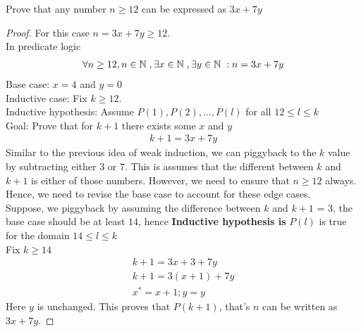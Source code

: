 \documentclass[11pt]{article}
\begin{document}
\begin{theorem}
    Prove that any number $n \geq 12$ can be expressed as $3x + 7y$
\end{theorem}

\begin{proof}
    For this case $n = 3x + 7y \geq 12$. \\
    In predicate logic
    \begin{gather}
        \forall n \geq 12, n \in \mathbb{N}\hspace{1.0mm}, \exists x \in \mathbb{N}\hspace{1.0mm}, \exists y \in \mathbb{N}\hspace{1.0mm}: n = 3x + 7y
    \end{gather}
    Base case: $x = 4$ and $y = 0$ \\
    Inductive case: Fix $k \geq 12$. \\
    Inductive hypothesis: Assume $P(1), P(2), \ldots, P(l)$ for all $12 \leq l \leq k$ \\
    Goal: Prove that for $k+1$ there exists some $x$ and $y$
    \begin{gather}
        k + 1 = 3x + 7y
    \end{gather}
    Similar to the previous idea of weak induction, we can piggyback to the $k$ value by subtracting either $3$ or $7$. This is assumes that the different between $k$ and $k+1$ is either of those numbers. However, we need to ensure that $n \geq 12$ always. Hence, we need to revise the base case to account for these edge cases. \\

    Suppose, we piggyback by assuming the difference between $k$ and $k+1$ = 3, the base case should be at least $14$, hence \textbf{Inductive hypothesis is } $P(l)$ is true for the domain $14 \leq l \leq k$ \\
    Fix $k \geq 14$
    \begin{gather}
        k + 1 = 3x + 3 + 7y \\
        k + 1 = 3(x + 1) + 7y \\
        x^* = x + 1; y = y
    \end{gather}
    Here $y$ is unchanged. This proves that $P(k+1)$, that's $n$ can be written as $3x + 7y$.

\end{proof}
\end{document}

